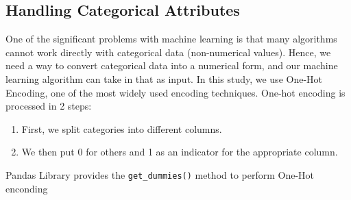 \subsection{Handling Categorical Attributes}

One of the significant problems with machine learning is that many algorithms
cannot work directly with categorical data (non-numerical values).  Hence, we
need a way to convert categorical data into a numerical form, and our machine
learning algorithm can take in that as input. In this study, we use  One-Hot
Encoding, one of the most widely used encoding techniques.  One-hot encoding is
processed in 2 steps:
\begin{enumerate}
    \item First, we split categories into different columns.
    \item We then put 0 for others and 1 as an indicator for the appropriate column.
\end{enumerate}

\noindent Pandas Library provides  the \texttt{get\_dummies()} method to
perform One-Hot enconding

